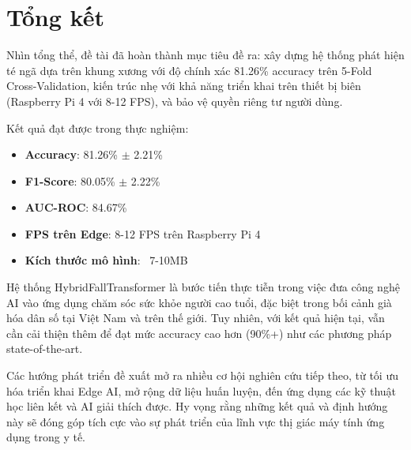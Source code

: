 
\section{Tổng kết}
\label{sec:final_summary}

Nhìn tổng thể, đề tài đã hoàn thành mục tiêu đề ra: xây dựng hệ thống phát hiện té ngã dựa trên khung xương với độ chính xác 81.26\% accuracy trên 5-Fold Cross-Validation, kiến trúc nhẹ với khả năng triển khai trên thiết bị biên (Raspberry Pi 4 với 8-12 FPS), và bảo vệ quyền riêng tư người dùng.

Kết quả đạt được trong thực nghiệm:

\begin{itemize}
    \item \textbf{Accuracy}: 81.26\% $\pm$ 2.21\%
    \item \textbf{F1-Score}: 80.05\% $\pm$ 2.22\%
    \item \textbf{AUC-ROC}: 84.67\%
    \item \textbf{FPS trên Edge}: 8-12 FPS trên Raspberry Pi 4
    \item \textbf{Kích thước mô hình}: ~7-10MB
\end{itemize}

Hệ thống HybridFallTransformer là bước tiến thực tiễn trong việc đưa công nghệ AI vào ứng dụng chăm sóc sức khỏe người cao tuổi, đặc biệt trong bối cảnh già hóa dân số tại Việt Nam và trên thế giới. Tuy nhiên, với kết quả hiện tại, vẫn cần cải thiện thêm để đạt mức accuracy cao hơn (90\%+) như các phương pháp state-of-the-art.

Các hướng phát triển đề xuất mở ra nhiều cơ hội nghiên cứu tiếp theo, từ tối ưu hóa triển khai Edge AI, mở rộng dữ liệu huấn luyện, đến ứng dụng các kỹ thuật học liên kết và AI giải thích được. Hy vọng rằng những kết quả và định hướng này sẽ đóng góp tích cực vào sự phát triển của lĩnh vực thị giác máy tính ứng dụng trong y tế.

